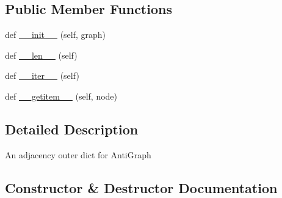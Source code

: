 \subsection*{Public Member Functions}
\begin{DoxyCompactItemize}
\item 
def \hyperlink{classnetworkx_1_1algorithms_1_1approximation_1_1kcomponents_1_1__AntiGraph_1_1AntiAdjacencyView_a88b2b9f5cb975d60cb65158e69430a88}{\+\_\+\+\_\+init\+\_\+\+\_\+} (self, graph)
\item 
def \hyperlink{classnetworkx_1_1algorithms_1_1approximation_1_1kcomponents_1_1__AntiGraph_1_1AntiAdjacencyView_a103cfda9c3f93519ccc93a29664d7684}{\+\_\+\+\_\+len\+\_\+\+\_\+} (self)
\item 
def \hyperlink{classnetworkx_1_1algorithms_1_1approximation_1_1kcomponents_1_1__AntiGraph_1_1AntiAdjacencyView_a0cae8681cf8a0b6ccef9963950a4e782}{\+\_\+\+\_\+iter\+\_\+\+\_\+} (self)
\item 
def \hyperlink{classnetworkx_1_1algorithms_1_1approximation_1_1kcomponents_1_1__AntiGraph_1_1AntiAdjacencyView_a3bbda9713178572d5a03d2a1a813fe29}{\+\_\+\+\_\+getitem\+\_\+\+\_\+} (self, node)
\end{DoxyCompactItemize}


\subsection{Detailed Description}
\begin{DoxyVerb}An adjacency outer dict for AntiGraph\end{DoxyVerb}
 

\subsection{Constructor \& Destructor Documentation}
\mbox{\label{classnetworkx_1_1algorithms_1_1approximation_1_1kcomponents_1_1__AntiGraph_1_1AntiAdjacencyView_a88b2b9f5cb975d60cb65158e69430a88}} 
